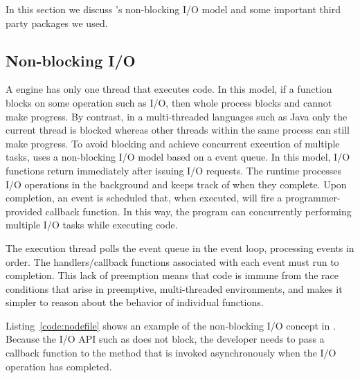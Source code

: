 In this section we discuss \nodejs's non-blocking I/O model and some
important third party packages we used.

\subsection{Non-blocking I/O}

A \js engine has only one thread that executes \js code.
In this model, if a function blocks on some operation such as I/O,
then whole process blocks and cannot make progress.
By contrast, in a multi-threaded languages such as Java only the
current thread is blocked whereas other threads within the same process can
still make progress.
To avoid blocking and achieve concurrent execution of multiple tasks, 
\js uses a non-blocking I/O model based on a event queue.
In this model, I/O functions return immediately after issuing I/O requests.
The runtime processes I/O operations in the background 
and keeps track of when they complete.  Upon completion, an
event is scheduled that, when executed, will fire a programmer-provided
callback function.
In this way, the program can concurrently performing multiple I/O tasks 
while executing \js code.

The execution thread polls the event queue in the event loop, processing
events in order.  The handlers/callback functions associated with each
event must run to completion.  This lack of preemption means that 
\js code is immune from the race conditions that arise in preemptive,
multi-threaded environments, and makes it simpler to reason about
the behavior of individual functions.



Listing~\ref{code:nodefile} shows an example of the non-blocking I/O concept in \nodejs. 
Because the I/O API such as  does not block, 
the developer needs to pass a callback function to the  method  
that is invoked asynchronously when the I/O operation has completed.

